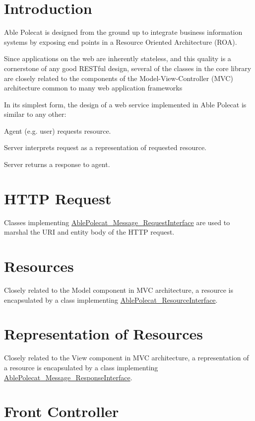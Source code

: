 \hypertarget{index_introduction}{}\section{Introduction}\label{index_introduction}
Able Polecat is designed from the ground up to integrate business information systems by exposing end points in a Resource Oriented Architecture (R\+O\+A).

Since applications on the web are inherently stateless, and this quality is a cornerstone of any good R\+E\+S\+Tful design, several of the classes in the core library are closely related to the components of the Model-\/\+View-\/\+Controller (M\+V\+C) architecture common to many web application frameworks

In its simplest form, the design of a web service implemented in Able Polecat is similar to any other\+:
\begin{DoxyEnumerate}
\item Agent (e.\+g. user) requests resource.
\item Server interprets request as a representation of requested resource.
\item Server returns a response to agent.
\end{DoxyEnumerate}\hypertarget{index_request}{}\section{H\+T\+T\+P Request}\label{index_request}
Classes implementing \hyperlink{interface_able_polecat___message___request_interface}{Able\+Polecat\+\_\+\+Message\+\_\+\+Request\+Interface} are used to marshal the U\+R\+I and entity body of the H\+T\+T\+P request.\hypertarget{index_resource}{}\section{Resources}\label{index_resource}
Closely related to the \textquotesingle{}Model\textquotesingle{} component in M\+V\+C architecture, a resource is encapsulated by a class implementing \hyperlink{interface_able_polecat___resource_interface}{Able\+Polecat\+\_\+\+Resource\+Interface}.\hypertarget{index_representation}{}\section{Representation of Resources}\label{index_representation}
Closely related to the \textquotesingle{}View\textquotesingle{} component in M\+V\+C architecture, a representation of a resource is encapsulated by a class implementing \hyperlink{interface_able_polecat___message___response_interface}{Able\+Polecat\+\_\+\+Message\+\_\+\+Response\+Interface}.\hypertarget{index_front_controller}{}\section{Front Controller}\label{index_front_controller}
